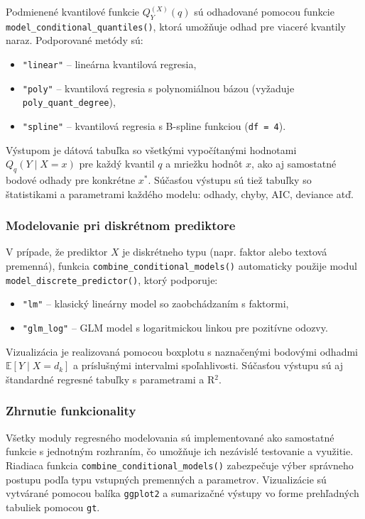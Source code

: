 Podmienené kvantilové funkcie $Q_Y^{(X)}(q)$ sú odhadované pomocou funkcie \texttt{model\_conditional\_quantiles()}, ktorá umožňuje odhad pre viaceré kvantily naraz. Podporované metódy sú:

\begin{itemize}
  \item \texttt{"linear"} – lineárna kvantilová regresia,
  \item \texttt{"poly"} – kvantilová regresia s polynomiálnou bázou (vyžaduje \texttt{poly\_quant\_degree}),
  \item \texttt{"spline"} – kvantilová regresia s B-spline funkciou (\texttt{df = 4}).
\end{itemize}

Výstupom je dátová tabuľka so všetkými vypočítanými hodnotami $Q_q(Y \mid X = x)$ pre každý kvantil $q$ a mriežku hodnôt $x$, ako aj samostatné bodové odhady pre konkrétne $x^*$. Súčasťou výstupu sú tiež tabuľky so štatistikami a parametrami každého modelu: odhady, chyby, AIC, deviance atď.

\subsubsection{Modelovanie pri diskrétnom prediktore}\label{subsec:app_discrete_pred}

V prípade, že prediktor $X$ je diskrétneho typu (napr. faktor alebo textová premenná), funkcia \texttt{combine\_conditional\_models()} automaticky použije modul \texttt{model\_discrete\_predictor()}, ktorý podporuje:

\begin{itemize}
  \item \texttt{"lm"} – klasický lineárny model so zaobchádzaním s faktormi,
  \item \texttt{"glm\_log"} – GLM model s logaritmickou linkou pre pozitívne odozvy.
\end{itemize}

Vizualizácia je realizovaná pomocou boxplotu s naznačenými bodovými odhadmi $\mathbb{E}[Y \mid X = d_k]$ a príslušnými intervalmi spoľahlivosti. Súčasťou výstupu sú aj štandardné regresné tabuľky s parametrami a R$^2$.

\subsubsection{Zhrnutie funkcionality}

Všetky moduly regresného modelovania sú implementované ako samostatné funkcie s jednotným rozhraním, čo umožňuje ich nezávislé testovanie a využitie. Riadiaca funkcia \texttt{combine\_conditional\_models()} zabezpečuje výber správneho postupu podľa typu vstupných premenných a parametrov. Vizualizácie sú vytvárané pomocou balíka \texttt{ggplot2} a sumarizačné výstupy vo forme prehľadných tabuliek pomocou \texttt{gt}.

